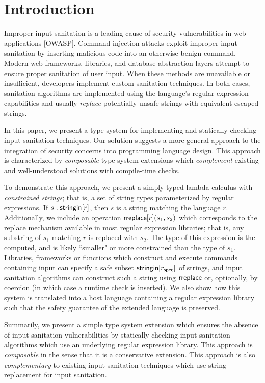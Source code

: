 \documentclass{acm_proc_article-sp}
\theoremstyle{definition}
\newcommand{\stringin}[1]{{\sf stringin}[#1]}
\begin{document}
\section{Introduction}\label{intro}
Improper input sanitation is a leading cause of security vulnerabilities in web applications [OWASP]. Command injection attacks exploit improper input sanitation by inserting malicious code into an otherwise benign command. Modern web frameworks, libraries, and database abstraction layers attempt to ensure proper sanitation of user input. When these methods are unavailable or insufficient, developers implement custom sanitation techniques. In both cases, sanitation algorithms are implemented using the language's regular expression capabilities and usually \emph{replace} potentially unsafe strings with equivalent escaped strings.

In this paper, we present a type system for implementing and statically checking input sanitation techniques. Our solution suggests a more general approach to the integration of security concerns into programming language design. This approach is characterized by \emph{composable} type system extensions which \emph{complement} existing and well-understood solutions with compile-time checks.

To demonstrate this approach, we present a simply typed lambda calculus with \emph{constrained strings}; that is, a set of string types parameterized by regular expressions. If $s : \stringin{r}$, then $s$ is a string matching the language $r$. Additionally, we include an operation ${\sf rreplace}[r](s_1,s_2)$ which corresponds to the replace mechanism available in most regular expression libraries; that is, any substring of $s_1$ matching $r$ is replaced with $s_2$. The type of this expression is the computed, and is likely ``smaller" or more constrained than the type of $s_1$. Libraries, frameworks or functions which construct and execute commands containing input can specify a safe subset $\stringin{r_{\sf spec}}$ of strings, and input sanitation algorithms can construct such a string using ${\sf rreplace}$ or, optionally, by coercion (in which case a runtime check is inserted). We also show how this system is translated into a host language containing a regular expression library such that the safety guarantee of the extended language is preserved.

Summarily, we present a simple type system extension which ensures the absence of input sanitation vulnerabilities by statically checking input sanitation algorithms which use an underlying regular expression library. This approach is \emph{composable} in the sense that it is a conservative extension. This approach is also \emph{complementary} to existing input sanitation techniques which use string replacement for input sanitation.
\end{document}
